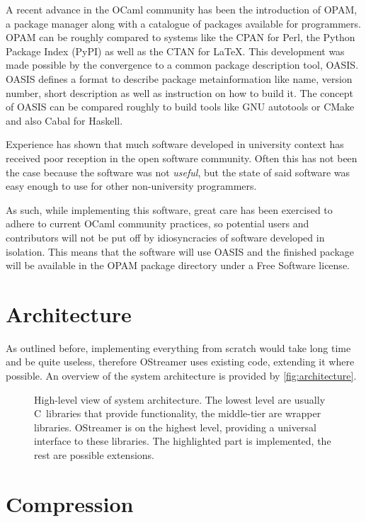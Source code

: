 \documentclass[parskip=half]{scrreprt}
\begin{document}
A recent advance in the OCaml community has been the introduction of OPAM, a
package manager along with a catalogue of packages available for programmers.
OPAM can be roughly compared to systems like the CPAN for Perl, the Python
Package Index (PyPI) as well as the CTAN for \LaTeX. This development was made
possible by the convergence to a common package description tool, OASIS. OASIS
defines a format to describe package metainformation like name, version number,
short description as well as instruction on how to build it. The concept of
OASIS can be compared roughly to build tools like GNU autotools or CMake and
also Cabal for Haskell.

Experience has shown that much software developed in university context has
received poor reception in the open software community. Often this has not been
the case because the software was not \emph{useful}, but the state of said
software was easy enough to use for other non-university programmers.

As such, while implementing this software, great care has been exercised to
adhere to current OCaml community practices, so potential users and
contributors will not be put off by idiosyncracies of software developed in
isolation. This means that the software will use OASIS and the finished package
will be available in the OPAM package directory under a Free Software license.

\section{Architecture}
\label{sec:architecture}

As outlined before, implementing everything from scratch would take long time
and be quite useless, therefore OStreamer uses existing code, extending it
where possible. An overview of the system architecture is provided by
\autoref{fig:architecture}.

\begin{figure}[h]
  \centering
  
  \caption{High-level view of system architecture. The lowest level are usually
    C~libraries that provide functionality, the middle-tier are wrapper
    libraries. OStreamer is on the highest level, providing a universal interface
    to these libraries. The highlighted part is implemented, the rest are
    possible extensions.}
  \label{fig:architecture}
\end{figure}

\section{Compression}
\label{sec:compression}
\end{document}
